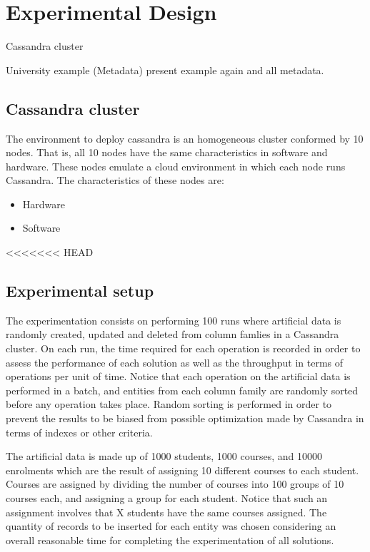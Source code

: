 \chapter{Experimental Design}
Cassandra cluster

University example (Metadata) present example again and all metadata.

\section{Cassandra cluster}

The environment to deploy cassandra is  an homogeneous cluster conformed by 10
nodes. That is, all 10 nodes have the same characteristics in software and
hardware. These nodes emulate a cloud environment in which each node runs
Cassandra. The characteristics of these nodes are:

\begin{itemize}
  \item Hardware
  \item Software
\end{itemize}



<<<<<<< HEAD
\section{Experimental setup}\label{s:exp:setup}
The experimentation consists on performing 100 runs where artificial data is
randomly created, updated and deleted from column famlies in a Cassandra
cluster.
On each run, the time required for each operation is recorded in order to assess the
performance of each solution as well as the throughput in terms of operations
per unit of time. Notice that each operation on the artificial data  is
performed in a batch, and entities from each column family are randomly sorted
before any operation takes place. Random sorting is performed in order to
prevent the results to be biased from possible optimization made by Cassandra in
terms of indexes or other criteria.
		
The artificial data is made up of 1000 students, 1000 courses, and 10000
enrolments which are the result of assigning 10 different courses to each
student. Courses are assigned by dividing the number of courses
into 100 groups of 10 courses each, and assigning a group for each student.
Notice that such an assignment involves that X students have the same courses
assigned. The quantity of records to be inserted for each entity was chosen
considering an overall reasonable time for completing the experimentation of all
solutions.
		
